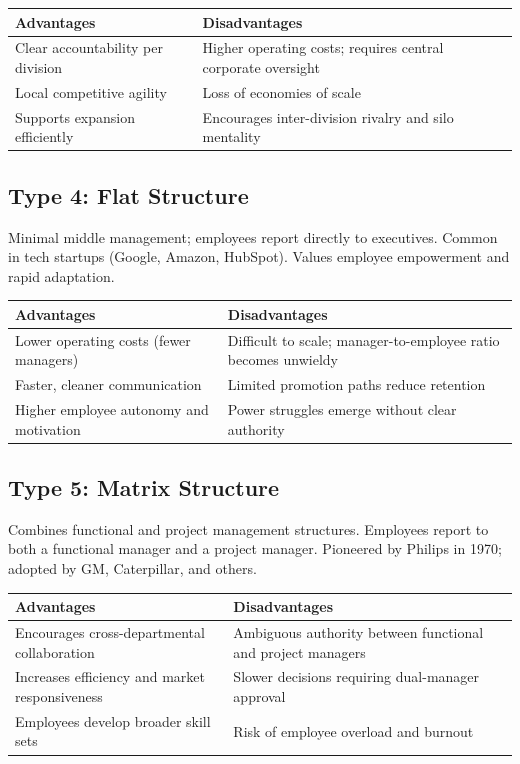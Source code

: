 \documentclass[11pt, letterpaper]{article}
\begin{document}
\begin{center}
\begin{tabular}{p{6.5cm} p{6.5cm}}
\toprule
\textbf{Advantages} & \textbf{Disadvantages} \\
\midrule
Clear accountability per division & Higher operating costs; requires central corporate oversight \\
Local competitive agility & Loss of economies of scale \\
Supports expansion efficiently & Encourages inter-division rivalry and silo mentality \\
\bottomrule
\end{tabular}
\end{center}

\subsection{Type 4: Flat Structure}
Minimal middle management; employees report directly to executives. Common in tech startups (Google, Amazon, HubSpot). Values employee empowerment and rapid adaptation.

\begin{center}
\begin{tabular}{p{6.5cm} p{6.5cm}}
\toprule
\textbf{Advantages} & \textbf{Disadvantages} \\
\midrule
Lower operating costs (fewer managers) & Difficult to scale; manager-to-employee ratio becomes unwieldy \\
Faster, cleaner communication & Limited promotion paths reduce retention \\
Higher employee autonomy and motivation & Power struggles emerge without clear authority \\
\bottomrule
\end{tabular}
\end{center}

\subsection{Type 5: Matrix Structure}
Combines functional and project management structures. Employees report to both a functional manager and a project manager. Pioneered by Philips in 1970; adopted by GM, Caterpillar, and others.

\begin{center}
\begin{tabular}{p{6.5cm} p{6.5cm}}
\toprule
\textbf{Advantages} & \textbf{Disadvantages} \\
\midrule
Encourages cross-departmental collaboration & Ambiguous authority between functional and project managers \\
Increases efficiency and market responsiveness & Slower decisions requiring dual-manager approval \\
Employees develop broader skill sets & Risk of employee overload and burnout \\
\bottomrule
\end{tabular}
\end{center}
\end{document}
